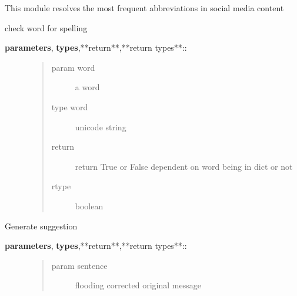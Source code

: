 \documentclass[letterpaper,10pt,english]{sphinxmanual}
\begin{document}
\begin{fulllineitems}
\label{API:norm.modules.abbreviation.Abbreviation}
This module resolves the most frequent abbreviations
in social media content

\begin{fulllineitems}
\label{API:norm.modules.abbreviation.Abbreviation.check_hunspell}
check word for spelling
\begin{description}
\item[{\textbf{parameters}, \textbf{types},**return**,**return types**::}] \leavevmode\begin{quote}\begin{description}
\item[{param word}] \leavevmode
a word

\item[{type word}] \leavevmode
unicode string

\item[{return}] \leavevmode
return True or False dependent on word being in dict or not

\item[{rtype}] \leavevmode
boolean

\end{description}\end{quote}

\end{description}

\end{fulllineitems}


\begin{fulllineitems}
\label{API:norm.modules.abbreviation.Abbreviation.generate_alternatives}
Generate suggestion
\begin{description}
\item[{\textbf{parameters}, \textbf{types},**return**,**return types**::}] \leavevmode\begin{quote}\begin{description}
\item[{param sentence}] \leavevmode
flooding corrected original message


\end{description}
\end{quote}
\end{description}
\end{fulllineitems}
\end{fulllineitems}
\end{document}
